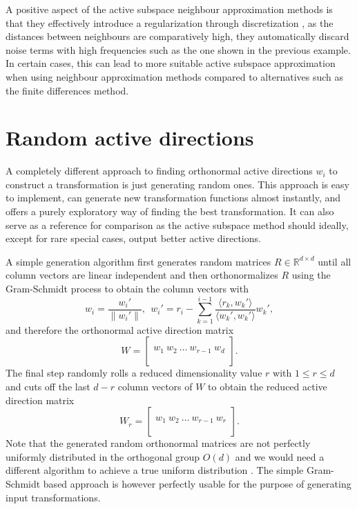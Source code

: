 \documentclass[
  a4paper,  %
  twoside,  %
  bibliography=totoc,
  headsepline,
  cleardoublepage=empty,
  parskip=half,
  draft=false
]{scrbook}
\begin{document}
A positive aspect of the active subspace neighbour approximation methods is that they effectively introduce a regularization through discretization \cite{Kress1999}, \ie as the distances between neighbours are comparatively high, they automatically discard noise terms with high frequencies such as the one shown in the previous example.
In certain cases, this can lead to more suitable active subspace approximation when using neighbour approximation methods compared to alternatives such as the finite differences method.

\section{Random active directions}
\label{sec:rt}

A completely different approach to finding orthonormal active directions $w_i$ to construct a transformation is just generating random ones.
This approach is easy to implement, can generate new transformation functions almost instantly, and offers a purely exploratory way of finding the best transformation.
It can also serve as a reference for comparison as the active subspace method should ideally, except for rare special cases, output better active directions.

A simple generation algorithm first generates random matrices $R \in \mathds{R}^{d \times d}$ until all column vectors are linear independent and then orthonormalizes $R$ using the Gram-Schmidt process to obtain the column vectors with
\begin{equation}
w_i=\frac{w_i'}{\| w_i' \|},~~ w_i'=r_i - \sum_{k=1}^{i-1} \frac{\langle r_k,  w_k' \rangle}{\langle w_k', w_k' \rangle} w_k',
\end{equation}
and therefore the orthonormal active direction matrix
\begin{equation}
W = \begin{bmatrix}
  \\
    w_1 ~ w_2 ~ \dots ~ w_{r-1} ~ w_d\\
    \\
  \end{bmatrix}.
\end{equation}
%
The final step randomly rolls a reduced dimensionality value $r$ with $1 \leq r \leq d$ and cuts off the last $d-r$ column vectors of $W$ to obtain the reduced active direction matrix
\begin{equation}
W_r = \begin{bmatrix}
  \\
    w_1 ~ w_2 ~ \dots ~ w_{r-1} ~ w_r\\
    \\
  \end{bmatrix}.
\end{equation}
%
Note that the generated random orthonormal matrices are not perfectly uniformly distributed in the orthogonal group $O(d)$ and we would need a different algorithm to achieve a true uniform distribution \cite{Wang2008}.
The simple Gram-Schmidt based approach is however perfectly usable for the purpose of generating input transformations.
\end{document}
